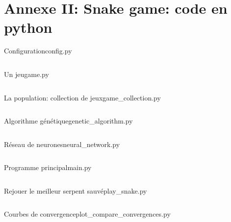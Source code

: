 \documentclass[10pt]{beamer}
\begin{document}

\section{Annexe II: \textbf{Snake game: code en python}}

\begin{frame}[t,allowframebreaks]{Configuration}{config.py}
\scriptsize
\inputminted[mathescape]{python}{../../snake-the-game/config.py}
\end{frame}

\begin{frame}[t,allowframebreaks]{Un jeu}{game.py}
\scriptsize
\inputminted[mathescape]{python}{../../snake-the-game/game.py}
\end{frame}

\begin{frame}[t,allowframebreaks]{La population: collection de jeux}{game\_collection.py}
\scriptsize
\inputminted[mathescape]{python}{../../snake-the-game/game_collection.py}
\end{frame}

\begin{frame}[t,allowframebreaks]{Algorithme génétique}{genetic\_algorithm.py}
\scriptsize
\inputminted[mathescape]{python}{../../snake-the-game/genetic_algorithm.py}
\end{frame}

\begin{frame}[t,allowframebreaks]{Réseau de neurones}{neural\_network.py}
\scriptsize
\inputminted[mathescape]{python}{../../snake-the-game/neural_network.py}
\end{frame}

\begin{frame}[t,allowframebreaks]{Programme principal}{main.py}
\scriptsize
\inputminted[mathescape]{python}{../../snake-the-game/main.py}
\end{frame}

\begin{frame}[t,allowframebreaks]{Rejouer le meilleur serpent sauvé}{play\_snake.py}
\scriptsize
\inputminted[mathescape]{python}{../../snake-the-game/play_snake.py}
\end{frame}

\begin{frame}[t,allowframebreaks]{Courbes de convergence}{plot\_compare\_convergences.py}
\scriptsize
\inputminted[mathescape]{python}{../../snake-the-game/plot_compare_convergences.py}
\end{frame}
\end{document}
